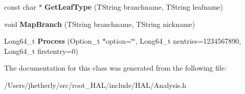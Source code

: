 \begin{DoxyCompactItemize}
\item 
\hypertarget{class_h_a_l_1_1_analysis_a8410426a53f7828270531f1ec56340b8}{const char $\ast$ {\bfseries Get\-Leaf\-Type} (T\-String branchname, T\-String leafname)}\label{class_h_a_l_1_1_analysis_a8410426a53f7828270531f1ec56340b8}

\item 
\hypertarget{class_h_a_l_1_1_analysis_a6e11fa65e712377587ed4b6a1a62c8aa}{void {\bfseries Map\-Branch} (T\-String branchname, T\-String nickname)}\label{class_h_a_l_1_1_analysis_a6e11fa65e712377587ed4b6a1a62c8aa}

\item 
\hypertarget{class_h_a_l_1_1_analysis_a4278a2e961076913371dec71da389701}{Long64\-\_\-t {\bfseries Process} (Option\-\_\-t $\ast$option=\char`\"{}\char`\"{}, Long64\-\_\-t nentries=1234567890, Long64\-\_\-t firstentry=0)}\label{class_h_a_l_1_1_analysis_a4278a2e961076913371dec71da389701}

\end{DoxyCompactItemize}


The documentation for this class was generated from the following file\-:\begin{DoxyCompactItemize}
\item 
/\-Users/jhetherly/src/root\-\_\-\-H\-A\-L/include/\-H\-A\-L/Analysis.\-h\end{DoxyCompactItemize}
